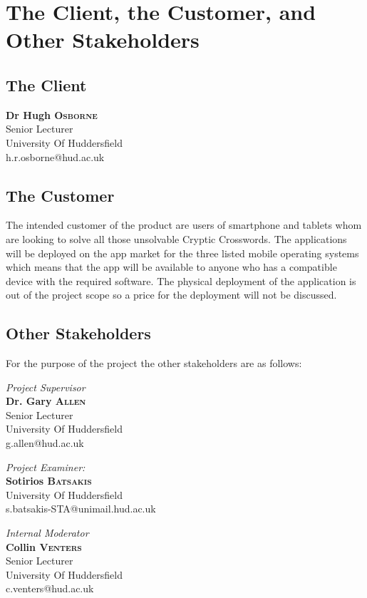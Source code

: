\section{The Client, the Customer, and Other Stakeholders}

\subsection{The Client}

	\textbf{Dr Hugh \textsc{Osborne}}\\
	Senior Lecturer\\
	University Of Huddersfield\\
	h.r.osborne@hud.ac.uk

\subsection{The Customer}

The intended customer of the product are users of smartphone and tablets whom are looking to solve all those unsolvable Cryptic Crosswords. The applications will be deployed on the app market for the three listed mobile operating systems which means that the app will be available to anyone who has a compatible device with the required software. The physical deployment of the application is out of the project scope so a price for the deployment will not be discussed.

\subsection{Other Stakeholders}

For the purpose of the project the other stakeholders are as follows:

      \emph{Project Supervisor}\\
      \textbf{Dr. Gary \textsc{Allen}} \\
      Senior Lecturer \\
      University Of Huddersfield \\
      g.allen@hud.ac.uk 

      \emph{Project Examiner:} \\ 
      \textbf{Sotirios \textsc{Batsakis}}\\
      University Of Huddersfield\\
      s.batsakis-STA@unimail.hud.ac.uk

      \emph{Internal Moderator}\\
      \textbf{Collin \textsc{Venters}} \\
      Senior Lecturer \\
      University Of Huddersfield \\
      c.venters@hud.ac.uk


